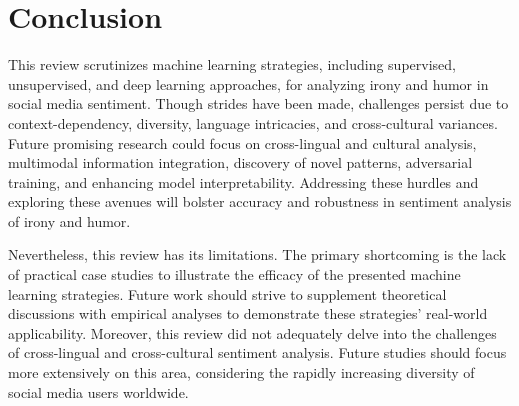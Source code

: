 \documentclass[a4paper]{article}
\begin{document}
\section{Conclusion}
This review scrutinizes machine learning strategies, including supervised, unsupervised, and deep learning approaches, for analyzing irony and humor in social media sentiment. Though strides have been made, challenges persist due to context-dependency, diversity, language intricacies, and cross-cultural variances. Future promising research could focus on cross-lingual and cultural analysis, multimodal information integration, discovery of novel patterns, adversarial training, and enhancing model interpretability. Addressing these hurdles and exploring these avenues will bolster accuracy and robustness in sentiment analysis of irony and humor.

Nevertheless, this review has its limitations. The primary shortcoming is the lack of practical case studies to illustrate the efficacy of the presented machine learning strategies. Future work should strive to supplement theoretical discussions with empirical analyses to demonstrate these strategies' real-world applicability. Moreover, this review did not adequately delve into the challenges of cross-lingual and cross-cultural sentiment analysis. Future studies should focus more extensively on this area, considering the rapidly increasing diversity of social media users worldwide.
\end{document}
